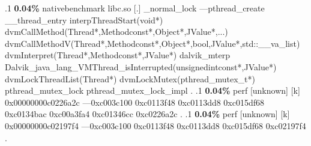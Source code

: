 \begin{profile}
{.1 \textbf{ 0.04\%} nativebenchmark  libc.so                [.] \_normal\_lock\newline {} ---pthread\_create\newline {} \_\_thread\_entry\newline {} interpThreadStart(void*)\newline {} dvmCallMethod(Thread*,Methodconst*,Object*,JValue*,...)\newline {} dvmCallMethodV(Thread*,Methodconst*,Object*,bool,JValue*,std::\_\_va\_list)\newline {} dvmInterpret(Thread*,Methodconst*,JValue*)\newline {} dalvik\_mterp\newline {} Dalvik\_java\_lang\_VMThread\_isInterrupted(unsignedintconst*,JValue*)\newline {} dvmLockThreadList(Thread*)\newline {} dvmLockMutex(pthread\_mutex\_t*)\newline {} pthread\_mutex\_lock\newline {} pthread\_mutex\_lock\_impl\newline {} . 
.1 \textbf{ 0.04\%} perf             [unknown]              [k] 0x00000000c0226a2c\newline {} ---0xc003c100\newline {} 0xc0113f48\newline {} 0xc0113dd8\newline {} 0xc015df68\newline {} 0xc0134bac\newline {} 0xc00a3fa4\newline {} 0xc01346cc\newline {} 0xc0226a2c\newline {} . 
.1 \textbf{ 0.04\%} perf             [unknown]              [k] 0x00000000c02197f4\newline {} ---0xc003c100\newline {} 0xc0113f48\newline {} 0xc0113dd8\newline {} 0xc015df68\newline {} 0xc02197f4\newline {} . 
}
\end{profile}
